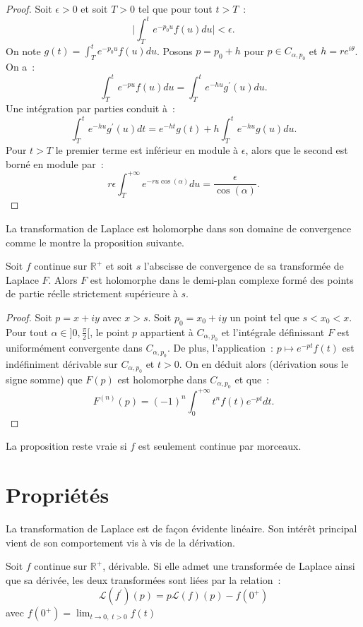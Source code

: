 \begin{proof}
Soit $\epsilon > 0$ et soit $T > 0$ tel que pour tout $t > T$~:
\[
\lvert \int_T^t e^{-p_0 u}f(u) du \rvert  < \epsilon.
\]
On note $g(t) = \int_T^t e^{-p_0 u}f(u) du$.
Posons $p = p_0 + h$ pour $p \in C_{\alpha, p_0}$ et $h = r e^{i
\theta}$. On a~:
\[
\int_T^t e^{-p u}f(u) du = \int_T^t e^{-hu}g^\prime(u) du.
\]
Une intégration par parties conduit à~:
\[
\int_T^t e^{-hu}g^\prime(u) dt = e^{-ht}g(t) + h \int_T^t e^{-hu}g(u) du.
\]
Pour $t > T$ le premier terme est inférieur en module à $\epsilon$, alors que le
second est borné en module par~:
\[
r \epsilon \int_T^{+\infty} e^{-r u \cos(\alpha)} d u =
\frac{\epsilon}{\cos(\alpha)}.
\]
\end{proof}
La transformation de Laplace est holomorphe dans son domaine de
convergence comme le montre la proposition suivante.

\begin{fprop}
Soit $f$ continue sur $\mathbb{R}^+$ et soit $s$ l'abscisse de
convergence de sa transformée de Laplace $F$. Alors $F$ est
holomorphe dans le demi-plan complexe formé des points de partie
réelle strictement supérieure à $s$.
\end{fprop}

\begin{proof}
Soit $p = x+iy$ avec $x > s$. Soit $p_0 = x_0 + i y$ un point tel
que $s < x_0 < x$. Pour tout $\alpha \in ]0, \frac{\pi}{2}[$, le point
$p$ appartient à $C_{\alpha, p_0}$ et l'intégrale définissant $F$
est uniformément convergente dans $C_{\alpha, p_0}$. De plus,
l'application~:
$
p \mapsto e^{-pt} f(t)
$
est indéfiniment dérivable sur $C_{\alpha, p_0}$ et $t > 0$. On en
déduit alors (dérivation sous le signe somme) que $F(p)$ est
holomorphe dans $C_{\alpha, p_0}$ et que~:
\[
F^{(n)}(p) = (-1)^n \int_0^{+\infty} t^n f(t) e^{-pt} dt.
\] 
\end{proof}
\begin{rem}
La proposition reste vraie si $f$ est seulement continue par morceaux.
\end{rem}
\section{Propriétés}
La transformation de Laplace est de façon évidente linéaire. Son
intérêt principal vient de son comportement vis à vis de la
dérivation.

\begin{fprop}
Soit $f$ continue sur $\mathbb{R}^+$, dérivable. Si elle admet une
transformée de 
Laplace ainsi que sa dérivée, les deux transformées
sont liées par la relation~:
\[
\mathcal{L}(f^\prime)(p) = p \mathcal{L}(f)(p) - f(0^+)
\] 
avec $f(0^+) = \lim_{ t \to 0, \; t > 0} f(t)$
\end{fprop}

